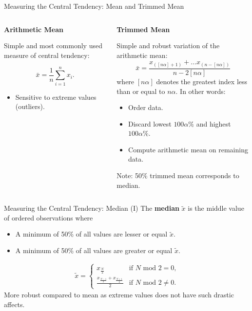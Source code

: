 \begin{frame}{Measuring the Central Tendency: Mean and Trimmed Mean}
  \begin{columns}
    \begin{column}{0.5\textwidth}
      \textbf{Arithmetic Mean}

      Simple and most commonly used measure of central tendency:

      \begin{equation*}
        \bar{x} = \frac{1}{n} \sum_{i=1}^{n} x_i.
      \end{equation*}

      \begin{itemize}
      \item Sensitive to extreme values (outliers).
      \end{itemize}
    \end{column}
    \begin{column}{0.5\textwidth}
      \textbf{Trimmed Mean}

      Simple and robust variation of the arithmetic mean:
      \begin{equation*}
        \bar{x} = \frac{x_{([n\alpha]+1)}+ \dots x_{(n-[n\alpha])}}{n-2[n\alpha]}
      \end{equation*}
      where $[n\alpha]$ denotes the greatest index less than or equal to $n\alpha$. In other words:

      \begin{itemize}
      \item Order data.
      \item Discard lowest $100\alpha\%$ and highest $100\alpha\%$.
      \item Compute arithmetic mean on remaining data.
      \end{itemize}


      Note: 50\% trimmed mean corresponds to median.
    \end{column}
  \end{columns}
\end{frame}

\begin{frame}{Measuring the Central Tendency: Median (I)}
  The \textbf{median} $\tilde{x}$ is the middle value of ordered observations where
  \begin{itemize}
  \item A minimum of 50\% of all values are lesser or equal $\tilde{x}$.
  \item A minimum of 50\% of all values are greater or equal $\tilde{x}$.
  \end{itemize}

  \begin{align*}
    \tilde{x} = \begin{cases}
      x_{\frac{N}{2}} & \text{if $N$ mod $2 = 0$,} \\
      \frac{x_{\frac{N-1}{2}}+x_{\frac{N+1}{2}}}{2} & \text{if $N$ mod $2 \neq 0$.}
    \end{cases}
  \end{align*}
  More robust compared to mean as extreme values does not have such drastic affects.
\end{frame}

